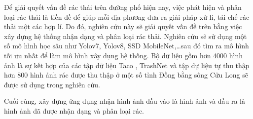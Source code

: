 \documentclass[./thesis.tex]{subfiles}
\begin{document}

{\fontsize{13}{12} \selectfont
Để giải quyết vấn đề rác thải trên đường phố hiện nay, việc phát hiện và phân loại rác thải là tiền đề để giúp mỗi địa phương đưa ra giải pháp xử lí, tái chế rác thải một các hợp lí.
Do đó, nghiên cứu này sẽ giải quyết vấn đề trên bằng việc xây dựng hệ thống nhận dạng và phân loại rác thải. Nghiên cứu sẽ sử dụng một số mô hình học sâu như Yolov7, Yolov8, SSD MobileNet,\dots sau đó tìm ra mô hình tối ưu nhất để làm mô hình xây dụng hệ thống. Bộ dữ liệu gồm hơn 4000 hình ảnh là sự kết hợp của các tập dữ liệu Taco \cite{proença2020taco}, TrashNet \cite{yang2016classification} và tập dự liệu tự thu thập hơn 800 hình ảnh rác được thu thập ở một số tỉnh Đồng bằng sông Cửu Long sẽ được sử dụng trong nghiên cứu.


Cuối cùng, xây dựng ứng dụng nhận hình ảnh đầu vào là hình ảnh và đầu ra là hình ảnh đã được nhận dạng và phân loại rác.
}
\bigskip



\end{document}
